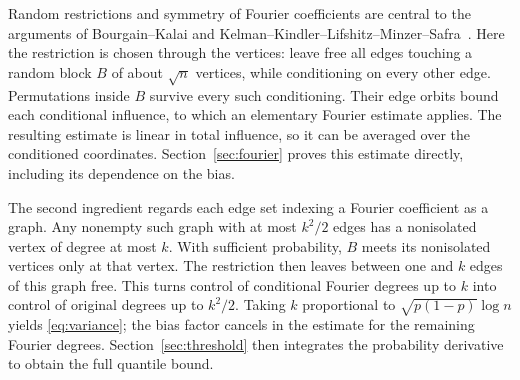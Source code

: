 Random restrictions and symmetry of Fourier coefficients are central
to the arguments of Bourgain--Kalai and
Kelman--Kindler--Lifshitz--Minzer--Safra~\cite{BK97,KKLMS20}.
Here the restriction is chosen through the vertices: leave free all
edges touching a random block $B$ of about $\sqrt n$ vertices, while
conditioning on every other edge. Permutations inside $B$ survive
every such conditioning. Their edge orbits bound each conditional
influence, to which an elementary Fourier estimate applies.
The resulting estimate is linear in total influence, so it can be
averaged over the conditioned coordinates. Section~\ref{sec:fourier}
proves this estimate directly, including its dependence on the bias.

The second ingredient regards each edge set indexing a Fourier
coefficient as a graph. Any nonempty such graph with at most $k^2/2$
edges has a nonisolated vertex of degree at most $k$. With sufficient
probability, $B$ meets its nonisolated vertices only at that vertex.
The restriction then leaves between one and $k$ edges of this graph
free. This turns control of conditional Fourier degrees up to $k$
into control of original degrees up to $k^2/2$. Taking $k$ proportional
to $\sqrt{p(1-p)}\log n$ yields \eqref{eq:variance}; the bias factor
cancels in the estimate for the remaining Fourier degrees.
Section~\ref{sec:threshold} then integrates the probability derivative
to obtain the full quantile bound.

